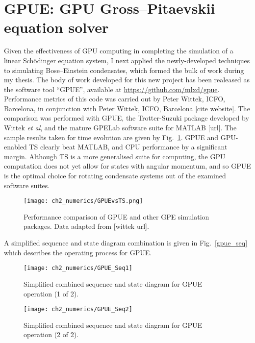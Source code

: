 \section{GPUE: GPU Gross--Pitaevskii equation solver}

Given the effectiveness of GPU computing in completing the simulation of a linear Sch\"odinger equation system, I next applied the newly-developed techniques to simulating Bose--Einstein condensates, which formed the bulk of work during my thesis. The body of work developed for this new project has been realeased as the software tool ``GPUE'', available at \url{https://github.com/mlxd/gpue}. Performance metrics of this code was carried out by Peter Wittek, ICFO, Barcelona, in conjunction with Peter Wittek, ICFO, Barcelona [cite website]. The comparison was performed with GPUE, the Trotter-Suzuki package developed by Wittek \textit{et al}, and the mature GPELab software suite for MATLAB [url]. The sample results taken for time evolution are given by Fig.~\ref{fig:gpuevsts}. GPUE and GPU-enabled TS clearly beat MATLAB, and CPU performance by a significant margin. Although TS is a more generalised suite for computing, the GPU computation does not yet allow for states with angular momentum, and so GPUE is the optimal choice for rotating condensate systems out of the examined software suites.

\begin{figure}[htb]
    \centering
    \texttt{[image: ch2\_numerics/GPUEvsTS.png]}
    \caption{Performance comparison of GPUE and other GPE simulation packages. Data adapted from [wittek url].}
    \label{fig:gpuevsts}
\end{figure}

A simplified sequence and state diagram combination is given in Fig.~\ref{gpue_seq} which describes the operating process for GPUE.

\begin{figure}[h]
    \centering
        \texttt{[image: ch2\_numerics/GPUE\_Seq1]}
    \caption{Simplified combined sequence and state diagram for GPUE operation (1 of 2).}
    \label{fig:gpue_seq}
\end{figure}
\begin{figure}[h]
    \centering
        \texttt{[image: ch2\_numerics/GPUE\_Seq2]}
    \caption{Simplified combined sequence and state diagram for GPUE operation (2 of 2).}
    \label{fig:gpue_seq}
\end{figure}
